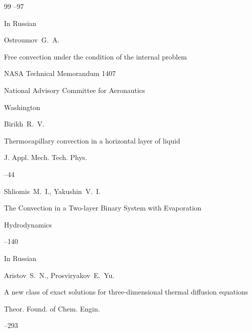\begin{thebibliography}{99}
--97 

\lang In Russian





\by Ostroumov~G.~A.

\thesis Free convection under the condition of the internal problem

\thesisinfo NASA Technical Memorandum 1407


\publ  National Advisory Committee for Aeronautics

\publaddr Washington




\by Birikh~R.~V.

\paper Thermocapillary convection in a horizontal layer of liquid

\jour J. Appl. Mech. Tech. Phys.



--44





\by Shliomis~M.~I., Yakushin~V.~I.

\paper The Convection in a Two-layer Binary System with Evaporation

\jour Hydrodynamics



--140

\lang In Russian




\by Aristov~S.~N., Prosviryakov~E.~Yu.

\paper A new class of exact solutions for three-dimensional thermal diffusion equations

\jour Theor. Found. of Chem. Engin.




--293






\end{thebibliography}
